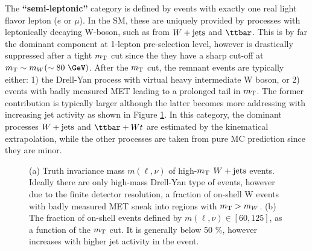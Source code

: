 The \textbf{``semi-leptonic''} category is defined by events with exactly one real light flavor lepton ($e$ or $\mu$). In the SM, these are uniquely provided by processes with leptonically decaying W-boson, such as from $W+\mathrm{jets}$ and $\ttbar$. This is by far the dominant component at 1-lepton pre-selection level, however is drastically suppressed after a tight $m_{\mathrm{T}}$ cut since the they have a sharp cut-off at $\mt \sim m_W (\sim 80~\GeV)$. After the $m_{\mathrm{T}}$ cut, the remnant events are typically either: 1) the Drell-Yan process with virtual heavy intermediate W boson, or 2) events with badly measured MET leading to a prolonged tail in $m_{\mathrm{T}}$. The former contribution is typically larger although the latter becomes more addressing with increasing jet activity as shown in Figure \ref{fig::BGestimation::Wmassline}. In this category, the dominant processes $W+\mathrm{jets}$ and $\ttbar+Wt$ are estimated by the kinematical extrapolation, while the other processes are taken from pure MC prediction since they are minor. \\
\begin{figure}[h]
  \centering
    \caption{ (a) Truth invariance mass $m(\ell,\nu)$ of high-$m_{\mathrm{T}}$ $W+\mathrm{jets}$ events. Ideally there are only high-mass Drell-Yan type of events, however due to the finite detector resolution, a fraction of on-shell W events with badly measured MET sneak into regions with $m_{\mathrm{T}}>m_W$. (b) The fraction of on-shell events defined by $m(\ell,\nu) \in [60,125]$, as a function of the $m_{\mathrm{T}}$ cut. It is generally below 50 $\%$, however increases with higher jet activity in the event. \label{fig::BGestimation::Wmassline} }
\end{figure}

